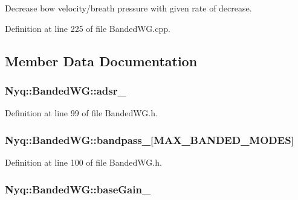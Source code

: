 Decrease bow velocity/breath pressure with given rate of decrease. 



Definition at line 225 of file Banded\+W\+G.\+cpp.



\subsection{Member Data Documentation}
\subsubsection[{\texorpdfstring{adsr\+\_\+}{adsr_}}]{ Nyq\+::\+Banded\+W\+G\+::adsr\+\_\+\hspace{0.3cm}{\ttfamily [protected]}}\hypertarget{class_nyq_1_1_banded_w_g_a8eeefb6c427d71374b879a8016b09f36}{}\label{class_nyq_1_1_banded_w_g_a8eeefb6c427d71374b879a8016b09f36}


Definition at line 99 of file Banded\+W\+G.\+h.

\subsubsection[{\texorpdfstring{bandpass\+\_\+}{bandpass_}}]{ Nyq\+::\+Banded\+W\+G\+::bandpass\+\_\+\mbox{[}{\bf M\+A\+X\+\_\+\+B\+A\+N\+D\+E\+D\+\_\+\+M\+O\+D\+ES}\mbox{]}\hspace{0.3cm}{\ttfamily [protected]}}\hypertarget{class_nyq_1_1_banded_w_g_acc292b275ed609a8d27d9a2e1976bde1}{}\label{class_nyq_1_1_banded_w_g_acc292b275ed609a8d27d9a2e1976bde1}


Definition at line 100 of file Banded\+W\+G.\+h.

\subsubsection[{\texorpdfstring{base\+Gain\+\_\+}{baseGain_}}]{ Nyq\+::\+Banded\+W\+G\+::base\+Gain\+\_\+\hspace{0.3cm}{\ttfamily [protected]}}\hypertarget{class_nyq_1_1_banded_w_g_acabdf8457d2148ad2b685918bcdb5bad}{}\label{class_nyq_1_1_banded_w_g_acabdf8457d2148ad2b685918bcdb5bad}



